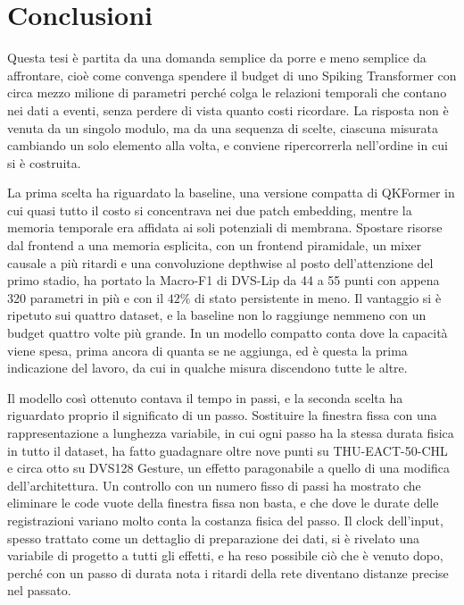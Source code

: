 \chapter*{Conclusioni}
\label{chap:conclusioni}
{}


Questa tesi è partita da una domanda semplice da porre e meno semplice da affrontare, cioè come convenga spendere il budget di uno Spiking Transformer con circa mezzo milione di parametri perché colga le relazioni temporali che contano nei dati a eventi, senza perdere di vista quanto costi ricordare. La risposta non è venuta da un singolo modulo, ma da una sequenza di scelte, ciascuna misurata cambiando un solo elemento alla volta, e conviene ripercorrerla nell'ordine in cui si è costruita.

La prima scelta ha riguardato la baseline, una versione compatta di QKFormer in cui quasi tutto il costo si concentrava nei due patch embedding, mentre la memoria temporale era affidata ai soli potenziali di membrana. Spostare risorse dal frontend a una memoria esplicita, con un frontend piramidale, un mixer causale a più ritardi e una convoluzione depthwise al posto dell'attenzione del primo stadio, ha portato la Macro-F1 di DVS-Lip da 44 a 55 punti con appena 320 parametri in più e con il $42\%$ di stato persistente in meno. Il vantaggio si è ripetuto sui quattro dataset, e la baseline non lo raggiunge nemmeno con un budget quattro volte più grande. In un modello compatto conta dove la capacità viene spesa, prima ancora di quanta se ne aggiunga, ed è questa la prima indicazione del lavoro, da cui in qualche misura discendono tutte le altre.

Il modello così ottenuto contava il tempo in passi, e la seconda scelta ha riguardato proprio il significato di un passo. Sostituire la finestra fissa con una rappresentazione a lunghezza variabile, in cui ogni passo ha la stessa durata fisica in tutto il dataset, ha fatto guadagnare oltre nove punti su THU-EACT-50-CHL e circa otto su DVS128 Gesture, un effetto paragonabile a quello di una modifica dell'architettura. Un controllo con un numero fisso di passi ha mostrato che eliminare le code vuote della finestra fissa non basta, e che dove le durate delle registrazioni variano molto conta la costanza fisica del passo. Il clock dell'input, spesso trattato come un dettaglio di preparazione dei dati, si è rivelato una variabile di progetto a tutti gli effetti, e ha reso possibile ciò che è venuto dopo, perché con un passo di durata nota i ritardi della rete diventano distanze precise nel passato.

